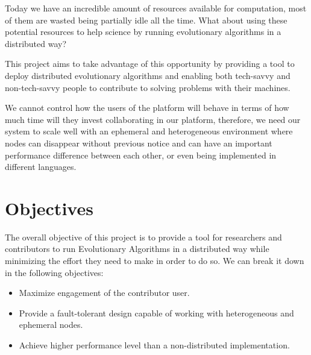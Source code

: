 Today we have an incredible amount of resources available for computation, most of them are wasted being partially idle all the time. What about using these potential resources to help science by running evolutionary algorithms in a distributed way?

This project aims to take advantage of this opportunity by providing a tool to deploy distributed evolutionary algorithms and enabling both tech-savvy and non-tech-savvy people to contribute to solving problems with their machines.

We cannot control how the users of the platform will behave in terms of how much time will they invest collaborating in our platform, therefore, we need our system to scale well with an ephemeral and heterogeneous environment where nodes can disappear without previous notice and can have an important performance difference between each other, or even being implemented in different languages. 


\section{Objectives}
The overall objective of this project is to provide a tool for researchers and contributors to run Evolutionary Algorithms in a distributed way while minimizing the effort they need to make in order to do so. We can break it down in the following objectives:

\begin{itemize}
    \item Maximize engagement of the contributor user.
    
    \item Provide a fault-tolerant design capable of working with heterogeneous and ephemeral nodes.
    
    \item Achieve higher performance level than a non-distributed implementation.
\end{itemize}

